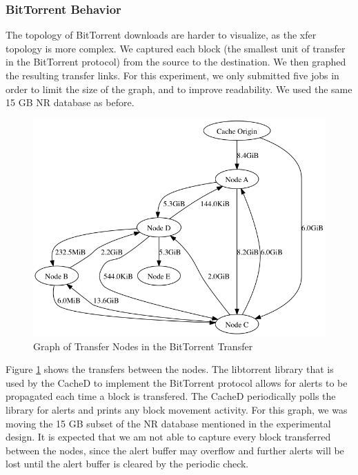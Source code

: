\subsubsection{BitTorrent Behavior}

The topology of BitTorrent downloads are harder to visualize, as the xfer topology is more complex. We captured each block (the smallest unit of transfer in the BitTorrent protocol) from the source to the destination.  We then graphed the resulting transfer links.  For this experiment, we only submitted five jobs in order to limit the size of the graph, and to improve readability.  We used the same 15 GB NR database as before.

\begin{figure}[h!t]
	
\centering
\includegraphics[width=\textwidth]{images/verbose_group_mod.png}
\caption{Graph of Transfer Nodes in the BitTorrent Transfer}
\label{fig:bittorrenttransfernodes}
	
\end{figure}

Figure \ref{fig:bittorrenttransfernodes} shows the transfers between the nodes.  The libtorrent library that is used by the CacheD to implement the BitTorrent protocol allows for alerts to be propagated each time a block is transfered.  The CacheD periodically polls the library for alerts and prints any block movement activity.  For this graph, we was moving the 15 GB subset of the NR database mentioned in the experimental design.  It is expected that we am not able to capture every block transferred between the nodes, since the alert buffer may overflow and further alerts will be lost until the alert buffer is cleared by the periodic check.

